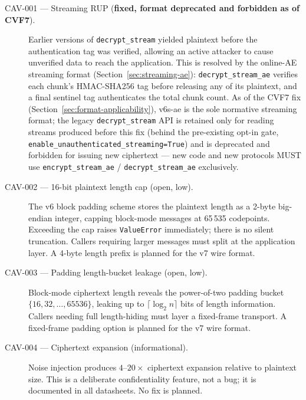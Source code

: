 \documentclass[11pt,a4paper]{article}
\begin{document}
\begin{description}
  \item[CAV-001 — Streaming RUP (\textbf{fixed, format deprecated and
        forbidden as of CVF7}).] Earlier versions of
        \texttt{decrypt\_stream} yielded plaintext before the authentication
        tag was verified, allowing an active attacker to cause unverified data
        to reach the application.  This is resolved by the online-AE streaming
        format (Section~\ref{sec:streaming-ae}):
        \texttt{decrypt\_stream\_ae} verifies each chunk's HMAC-SHA256 tag
        before releasing any of its plaintext, and a final sentinel tag
        authenticates the total chunk count.  As of the CVF7 fix
        (Section~\ref{sec:format-applicability}), v6s-ae is the sole
        normative streaming format; the legacy \texttt{decrypt\_stream} API
        is retained only for reading streams produced before this fix
        (behind the pre-existing opt-in gate,
        \texttt{enable\_unauthenticated\_streaming=True}) and is deprecated
        and forbidden for issuing new ciphertext — new code and new
        protocols MUST use \texttt{encrypt\_stream\_ae} /
        \texttt{decrypt\_stream\_ae} exclusively.

  \item[CAV-002 — 16-bit plaintext length cap (open, low).] The v6 block
        padding scheme stores the plaintext length as a 2-byte big-endian
        integer, capping block-mode messages at 65\,535 codepoints.  Exceeding
        the cap raises \texttt{ValueError} immediately; there is no silent
        truncation.  Callers requiring larger messages must split at the
        application layer.  A 4-byte length prefix is planned for the v7 wire
        format.

  \item[CAV-003 — Padding length-bucket leakage (open, low).] Block-mode
        ciphertext length reveals the power-of-two padding bucket
        $\{16, 32, \ldots, 65536\}$, leaking up to $\lceil\log_2 n\rceil$ bits
        of length information.  Callers needing full length-hiding must layer a
        fixed-frame transport.  A fixed-frame padding option is planned for the
        v7 wire format.

  \item[CAV-004 — Ciphertext expansion (informational).] Noise injection
        produces $4\text{--}20\times$ ciphertext expansion relative to
        plaintext size.  This is a deliberate confidentiality feature, not a
        bug; it is documented in all datasheets.  No fix is planned.
\end{description}
\end{document}
